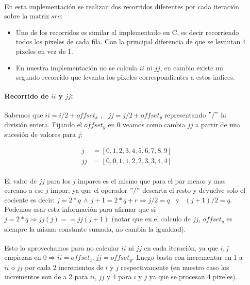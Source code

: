\documentclass[a4paper]{article}
\begin{document}
\paragraph{} En esta implementaci\'on se realizan dos recorridos diferentes por cada iteraci\'on sobre la matriz $src$: 
\begin{itemize}
	\item Uno de los recorridos es similar al implementado en C, es decir recorriendo todos los pixeles de cada fila. Con la principal diferencia de que se levantan 4 pixeles en vez de 1.
	\item En nuestra implementaci\'on no se calcula $ii$ ni $jj$, en cambio existe un segundo recorrido que levanta los pixeles correspondientes a estos indices.
\end{itemize}

\paragraph{Recorrido de $ii$ y $jj$:} 
\begin{center}
	Sabemos que $ii = i/2 + offset_x$ , \, $jj = j/2 + offset_y$ representando $"/"$ la divisi\'on entera. Fijando el $offset_y$ en 0 veamos como cambia $jj$ a partir de una sucesi\'on de valores para $j$:
	
	\begin{align*}
		j &= [0, 1, 2, 3, 4, 5, 6, 7, 8, 9]\\
		jj &= [0, 0, 1, 1, 2, 2, 3, 3, 4, 4]
	\end{align*}    
	
	\paragraph{} El valor de $jj$ para los $j$ impares es el mismo que para el par menor y mas cercano a ese $j$ impar, ya que el operador $"/"$ descarta el resto y devuelve solo el cociente es decir: $j = 2*q \, \wedge \, j+1 = 2*q + r \Rightarrow j/2 = q$ \, y \, $(j+1)/2 = q$. Podemos usar esta informaci\'on para afirmar que si $j = 2 * q \Rightarrow jj(j) == jj(j+1)$ (notar que en el calculo de $jj$, $offset_y$ es siempre la misma constante sumada, no cambia la igualdad).
	
	\paragraph{} Esto lo aprovechamos para no calcular $ii$ ni $jj$ en cada iteraci\'on, ya que $i, j$ empiezan en $0 \Rightarrow ii = offset_x, jj=offset_y$. Luego basta con incrementar en 1 a $ii$ o $jj$ por cada 2 incrementos de $i$ y $j$ respectivamente (en nuestro caso los incrementos son de a 2 para $ii$, $jj$ y 4 para $i$ y $j$ ya que se procesan 4 pixeles).
\end{center}
\end{document}
